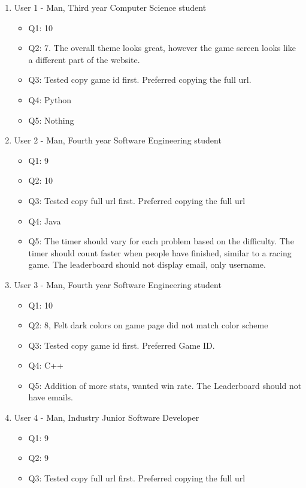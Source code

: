\documentclass[12pt, titlepage]{article}
\begin{document}
\begin{enumerate}
    \item User 1 - Man, Third year Computer Science student
    \begin{itemize}
        \item Q1: 10
        \item Q2: 7. The overall theme looks great, however the game screen looks like a different part of the website.
        \item Q3: Tested copy game id first. Preferred copying the full url.
        \item Q4: Python
        \item Q5: Nothing
    \end{itemize}
    \item User 2 - Man, Fourth year Software Engineering student
    \begin{itemize}
        \item Q1: 9
        \item Q2: 10
        \item Q3: Tested copy full url first. Preferred copying the full url
        \item Q4: Java
        \item Q5: The timer should vary for each problem based on the difficulty. The timer should count faster when people have finished, similar to a racing game. The leaderboard should not display email, only username.
    \end{itemize}
    \item User 3 - Man, Fourth year Software Engineering student
    \begin{itemize}
        \item Q1: 10
        \item Q2: 8, Felt dark colors on game page did not match color scheme
        \item Q3: Tested copy game id first. Preferred Game ID.
        \item Q4: C++
        \item Q5: Addition of more stats, wanted win rate. The Leaderboard should not have emails.
    \end{itemize}
    \item User 4 - Man, Industry Junior Software Developer
    \begin{itemize}
        \item Q1: 9
        \item Q2: 9
        \item Q3: Tested copy full url first. Preferred copying the full url

\end{itemize}
\end{enumerate}
\end{document}
